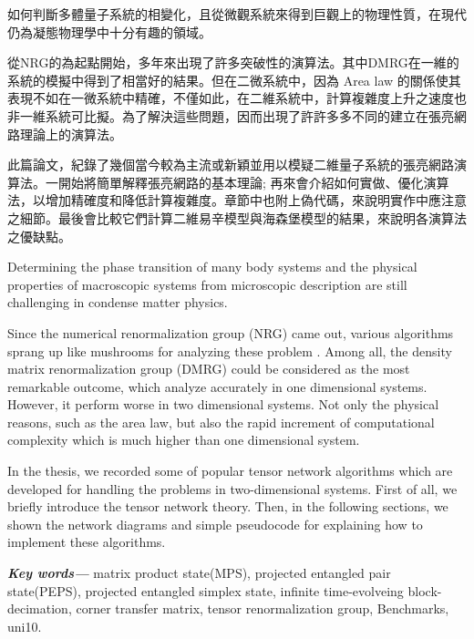 \providecommand{\keywords}[1]{\textbf{\textit{Key words---}} #1}

\begin{abstractzh}
如何判斷多體量子系統的相變化，且從微觀系統來得到巨觀上的物理性質，在現代仍為凝態物理學中十分有趣的領域。

從NRG的為起點開始，多年來出現了許多突破性的演算法。其中DMRG在一維的系統的模擬中得到了相當好的結果。但在二微系統中，因為 Area law 的關係使其表現不如在一微系統中精確，不僅如此，在二維系統中，計算複雜度上升之速度也非一維系統可比擬。為了解決這些問題，因而出現了許許多多不同的建立在張亮網路理論上的演算法。

此篇論文，紀錄了幾個當今較為主流或新穎並用以模疑二維量子系統的張亮網路演算法。一開始將簡單解釋張亮網路的基本理論; 再來會介紹如何實做、優化演算法，以增加精確度和降低計算複雜度。章節中也附上偽代碼，來說明實作中應注意之細節。最後會比較它們計算二維易辛模型與海森堡模型的結果，來說明各演算法之優缺點。

\end{abstractzh}

\begin{abstracten}
  Determining the phase transition of many body systems and the physical properties of macroscopic systems from microscopic description are still challenging in condense matter physics.

  Since the numerical renormalization group (NRG) came out, various algorithms sprang up like mushrooms for analyzing these problem . Among all, the density matrix renormalization group (DMRG) could be considered as the most remarkable outcome, which analyze accurately in one dimensional systems. However, it perform worse in two dimensional systems. Not only the physical reasons, such as the area law, but also the rapid increment of computational complexity which is much higher than one dimensional system.

  In the thesis, we recorded some of popular tensor network algorithms which are developed for handling the problems in two-dimensional systems. First of all, we briefly introduce the tensor network theory. Then, in the following sections, we shown the network diagrams and simple pseudocode for explaining how to implement these algorithms.

\end{abstracten}

\keywords{matrix product state(MPS), projected entangled pair state(PEPS), projected entangled simplex state, infinite time-evolveing block-decimation, corner transfer matrix, tensor renormalization group, Benchmarks, uni10.}

\begin{comment}
\category{I2.10}{Computing Methodologies}{Artificial Intelligence --
Vision and Scene Understanding} \category{H5.3}{Information
Systems}{Information Interfaces and Presentation (HCI) -- Web-based
Interaction.}

\terms{Design, Human factors, Performance.}
\end{comment}
